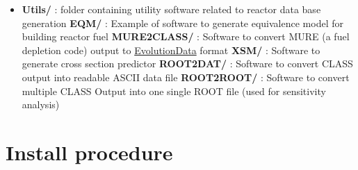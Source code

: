 \begin{itemize}
\item \textbf{Utils/} : folder containing utility software related to reactor data base generation
\subitem \textbf{EQM/} : Example of software to generate equivalence model for building reactor fuel
\subitem \textbf{MURE2CLASS/} : Software to convert MURE (a fuel depletion code)  output to \hyperref[sec:EvolutionData]{EvolutionData} format
\subitem \textbf{XSM/} : Software to generate cross section predictor
\subitem \textbf{ROOT2DAT/} : Software to convert CLASS output into readable ASCII data file
\subitem \textbf{ROOT2ROOT/} : Software to convert multiple CLASS Output into one single ROOT file (used for sensitivity analysis)
 
 
\end{itemize}

\chapter{Install procedure}

